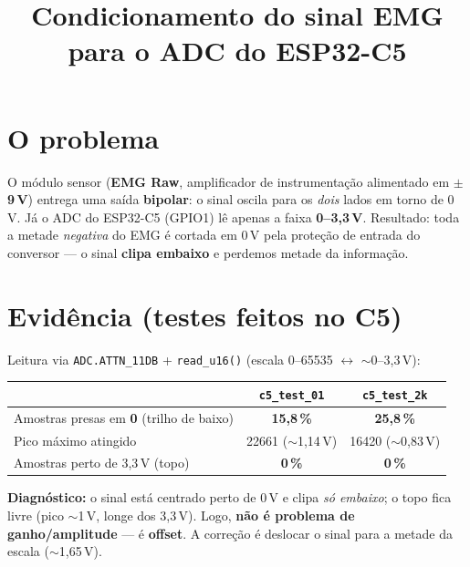 \documentclass[11pt,a4paper]{article}
\title{\vspace{-1.2cm}\textbf{Condicionamento do sinal EMG para o ADC do ESP32-C5}}
\author{}
\date{}
\begin{document}
\maketitle
\vspace{-1.6cm}

\section{O problema}

O módulo sensor (\textbf{EMG Raw}, amplificador de instrumentação alimentado em
\textbf{$\pm$9\,V}) entrega uma saída \textbf{bipolar}: o sinal oscila para os
\emph{dois} lados em torno de 0\,V. Já o ADC do ESP32-C5 (GPIO1) lê apenas a
faixa \textbf{0--3,3\,V}. Resultado: toda a metade \emph{negativa} do EMG é
cortada em 0\,V pela proteção de entrada do conversor --- o sinal
\textbf{clipa embaixo} e perdemos metade da informação.

\section{Evidência (testes feitos no C5)}

Leitura via \texttt{ADC.ATTN\_11DB} + \texttt{read\_u16()} (escala 0--65535
$\leftrightarrow$ $\sim$0--3,3\,V):

\begin{center}
\begin{tabular}{lcc}
\toprule
 & \texttt{c5\_test\_01} & \texttt{c5\_test\_2k} \\
\midrule
Amostras presas em \textbf{0} (trilho de baixo) & \textbf{15,8\,\%} & \textbf{25,8\,\%} \\
Pico máximo atingido & 22661 ($\sim$1,14\,V) & 16420 ($\sim$0,83\,V) \\
Amostras perto de 3,3\,V (topo) & \textbf{0\,\%} & \textbf{0\,\%} \\
\bottomrule
\end{tabular}
\end{center}

\textbf{Diagnóstico:} o sinal está centrado perto de 0\,V e clipa
\emph{só embaixo}; o topo fica livre (pico $\sim$1\,V, longe dos 3,3\,V). Logo,
\textbf{não é problema de ganho/amplitude} --- é \textbf{offset}. A correção é
deslocar o sinal para a metade da escala ($\sim$1,65\,V).
\end{document}
